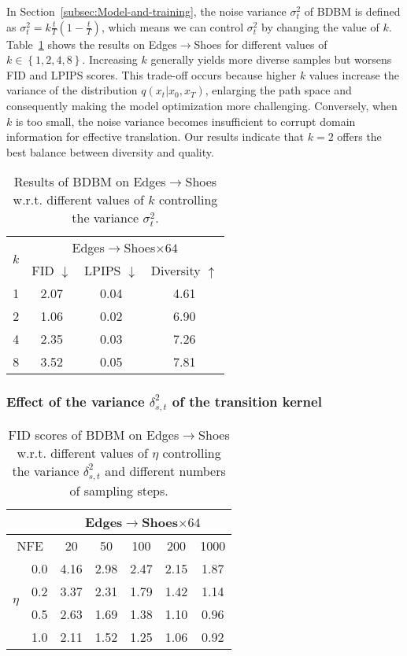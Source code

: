 In Section~\ref{subsec:Model-and-training}, the noise variance $\sigma_{t}^{2}$
of BDBM is defined as $\sigma_{t}^{2}=k\frac{t}{T}\left(1-\frac{t}{T}\right)$,
which means we can control $\sigma_{t}^{2}$ by changing the value
of $k$. Table~\ref{tab:ablation_k} shows the results on Edges$\rightarrow$Shoes
for different values of $k\in\left\{ 1,2,4,8\right\} $. Increasing
$k$ generally yields more diverse samples but worsens FID and LPIPS
scores. This trade-off occurs because higher $k$ values increase
the variance of the distribution $q\left(x_{t}|x_{0},x_{T}\right)$,
enlarging the path space and consequently making the model optimization
more challenging. Conversely, when $k$ is too small, the noise variance
becomes insufficient to corrupt domain information for effective translation.
Our results indicate that $k=2$ offers the best balance between diversity
and quality.

\begin{table}
\begin{centering}
\begin{tabular}{cccc}
\toprule 
\multirow{2}{*}{$k$} & \multicolumn{3}{c}{Edges$\rightarrow$Shoes$\times64$}\tabularnewline
\cmidrule{2-4} 
 & FID $\downarrow$ & LPIPS $\downarrow$ & Diversity $\uparrow$\tabularnewline
\midrule
\midrule 
1 & 2.07 & 0.04 & 4.61\tabularnewline
\midrule 
2 & 1.06 & 0.02 & 6.90\tabularnewline
\midrule 
4 & 2.35 & 0.03 & 7.26\tabularnewline
\midrule 
8 & 3.52 & 0.05 & 7.81\tabularnewline
\bottomrule
\end{tabular}
\par\end{centering}
\caption{Results of BDBM on Edges$\rightarrow$Shoes w.r.t. different values
of $k$ controlling the variance $\sigma_{t}^{2}$.\label{tab:ablation_k}}
\end{table}


\subsubsection{Effect of the variance $\delta_{s,t}^{2}$ of the transition kernel\label{subsec:transition_variance_ablation}}

\begin{table}
\begin{centering}
\begin{tabular}{ccccccc}
\toprule 
 &  & \multicolumn{5}{c}{Edges$\rightarrow$Shoes$\times64$}\tabularnewline
\midrule 
\multicolumn{2}{c}{NFE} & 20 & 50 & 100 & 200 & 1000\tabularnewline
\midrule
\midrule 
\multirow{4}{*}{$\eta$} & 0.0 & 4.16 & 2.98 & 2.47 & 2.15 & 1.87\tabularnewline
\cmidrule{2-7} 
 & 0.2 & 3.37 & 2.31 & 1.79 & 1.42 & 1.14\tabularnewline
\cmidrule{2-7} 
 & 0.5 & 2.63 & 1.69 & 1.38 & 1.10 & 0.96\tabularnewline
\cmidrule{2-7} 
 & 1.0 & 2.11 & 1.52 & 1.25 & 1.06 & 0.92\tabularnewline
\bottomrule
\end{tabular}
\par\end{centering}
\caption{FID scores of BDBM on Edges$\rightarrow$Shoes w.r.t. different values
of $\eta$ controlling the variance $\delta_{s,t}^{2}$ and different
numbers of sampling steps.\label{tab:ablation_eta}}
\end{table}

